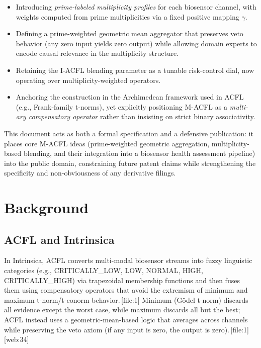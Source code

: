 \documentclass[11pt]{article}
\begin{document}
\begin{itemize}
  \item Introducing \emph{prime-labeled multiplicity profiles} for each biosensor channel, with weights computed from prime multiplicities via a fixed positive mapping $\gamma$.
  \item Defining a prime-weighted geometric mean aggregator that preserves veto behavior (any zero input yields zero output) while allowing domain experts to encode causal relevance in the multiplicity structure.
  \item Retaining the I-ACFL blending parameter as a tunable risk-control dial, now operating over multiplicity-weighted operators.
  \item Anchoring the construction in the Archimedean framework used in ACFL (e.g., Frank-family t-norms), yet explicitly positioning M-ACFL as a \emph{multi-ary compensatory operator} rather than insisting on strict binary associativity.
\end{itemize}

This document acts as both a formal specification and a defensive publication: it places core M-ACFL ideas (prime-weighted geometric aggregation, multiplicity-based blending, and their integration into a biosensor health assessment pipeline) into the public domain, constraining future patent claims while strengthening the specificity and non-obviousness of any derivative filings.

\section{Background}

\subsection{ACFL and Intrinsica}

In Intrinsica, ACFL converts multi-modal biosensor streams into fuzzy linguistic categories (e.g., CRITICALLY\_LOW, LOW, NORMAL, HIGH, CRITICALLY\_HIGH) via trapezoidal membership functions and then fuses them using compensatory operators that avoid the extremism of minimum and maximum t-norm/t-conorm behavior.\,[file:1] 
Minimum (G\"odel t-norm) discards all evidence except the worst case, while maximum discards all but the best; ACFL instead uses a geometric-mean-based logic that averages across channels while preserving the veto axiom (if any input is zero, the output is zero).\,[file:1][web:34] 
\end{document}
